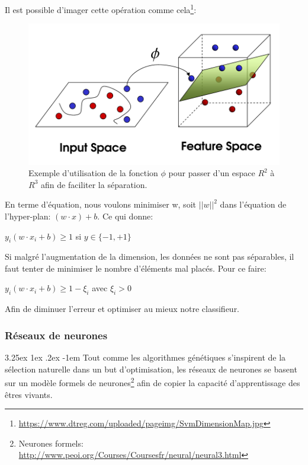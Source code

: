 \documentclass[a4paper, 11pt]{article}
\makeatletter
\renewcommand\paragraph{\@startsection{paragraph}{5}{\z@}%
  {3.25ex \@plus1ex \@minus.2ex}%
  {-1em}%
  {\normalfont\normalsize\bfseries}}
\makeatother
\begin{document}
Il est possible d'imager cette opération comme cela\footnote{\url{https://www.dtreg.com/uploaded/pageimg/SvmDimensionMap.jpg}}:
\begin{figure}[H]
\centering
\includegraphics[scale=0.3]{images/svm_exemple_phi}
\caption{Exemple d'utilisation de la fonction $\phi$ pour passer d'un espace $R^2$ à $R^3$ afin de faciliter la séparation.}
\end{figure}


En terme d'équation, nous voulons minimiser w, soit $||w||^2$ dans l'équation de l'hyper-plan: $(w \cdot x) + b$. Ce qui donne:
\begin{center}
$y_i (w \cdot x_i + b) \ge 1$ si $y \in \{-1, +1\}$ \cite{svm_equation}
\end{center}
Si malgré l'augmentation de la dimension, les données ne sont pas séparables, il faut tenter de minimiser le nombre d'éléments mal placés. Pour ce faire:
\begin{center}
$y_i (w \cdot x_i + b) \ge 1 - \xi_i$ avec $\xi_i > 0$ \cite{svm_equation}
\end{center}
Afin de diminuer l'erreur et optimiser au mieux notre classifieur.


\subsubsection{Réseaux de neurones}
\paragraph{}
Tout comme les algorithmes génétiques s'inspirent de la sélection naturelle dans un but d'optimisation, les réseaux de neurones se basent sur un modèle formels de neurones\footnote{Neurones formels: \url{http://www.peoi.org/Courses/Coursesfr/neural/neural3.html}} afin de copier la capacité d'apprentissage des êtres vivants.
\end{document}
